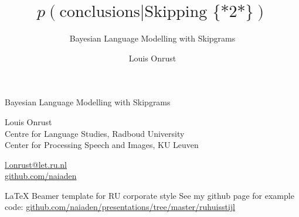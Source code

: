 \usepackage{multirow}
%
%
\def\CC{{C\nolinebreak[4]\hspace{-.05em}\raisebox{.4ex}{\tiny\bf ++}}}


\author{Louis Onrust}
\title{$p(\text{conclusions} | \text{Skipping \{*2*\}})$}
\subtitle{Bayesian Language Modelling with Skipgrams}
\date{}


\begin{frame}
    \titlepage
\end{frame}
\note[itemize]{
}

\begin{frame}{Bayesian Language Modelling with Skipgrams}

\begin{block}{}
    Louis Onrust \\
    Centre for Language Studies, Radboud University \\
    Center for Processing Speech and Images, KU Leuven
\end{block}

\begin{block}{}
    \href{mailto:l.onrust@let.ru.nl}{l.onrust@let.ru.nl} \\
    \href{https://github.com/naiaden}{github.com/naiaden}
\end{block}

\vfill

\begin{block}{\LaTeX{} Beamer template for RU corporate style}
    See my github page for example code:
    \href{https://github.com/naiaden/presentations/tree/master/ruhuisstijl}{github.com/naiaden/presentations/tree/master/ruhuisstijl}
\end{block}

\end{frame}
\note[itemize]{
}

